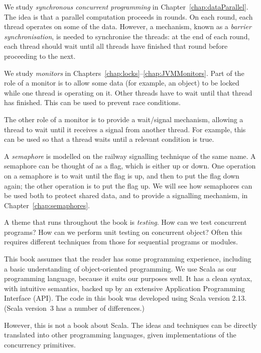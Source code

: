 We study \emph{synchronous concurrent programming} in Chapter~\ref{chap:dataParallel}.  The idea is
that a parallel computation proceeds in rounds.  On each round, each thread
operates on some of the data.  However, a mechanism, known as a \emph{barrier
  synchronisation}, is needed to synchronise
the threads: at the end of each round, each thread should wait until all
threads have finished that round before proceeding to the next.

We study \emph{monitors} in
Chapters~\ref{chap:locks}--\ref{chap:JVMMonitors}.  Part of the role of a
monitor is to allow some data (for example, an object) to be locked while one
thread is operating on it.  Other threads have to wait until that thread has
finished.  This can be used to prevent race conditions.

The other role of a monitor is to provide a wait/signal mechanism, allowing a
thread to wait until it receives a signal from another thread.  For example,
this can be used so that a thread waits until a relevant condition is true.

A \emph{semaphore} is modelled on the railway signalling
technique of the same name.  A semaphore can be thought of as a flag, which is
either up or down.  One operation on a semaphore is to wait until the flag is
up, and then to put the flag down again; the other operation is to put the
flag up.  We will see how semaphores can be used both to protect shared data,
and to provide a signalling mechanism, in Chapter~\ref{chap:semaphores}.

A theme that runs throughout the book is \emph{testing}.  How
can we test concurrent programs?  How can we perform unit testing on
concurrent object?  Often this requires different techniques from those for
sequential programs or modules.


\medskip

This book  assumes that the reader has some programming experience,
including a basic understanding of object-oriented programming.  We use
Scala as our programming language, because it suits our purposes well.  It has
a clean syntax, with intuitive semantics, backed up by an extensive
Application Programming Interface (API).
The code in this book was developed using Scala version 2.13.  (Scala
version~3 has a number of differences.) 

However, this is not a book about Scala.  The ideas and techniques can be
directly translated into other programming languages, given implementations of
the concurrency primitives. 

